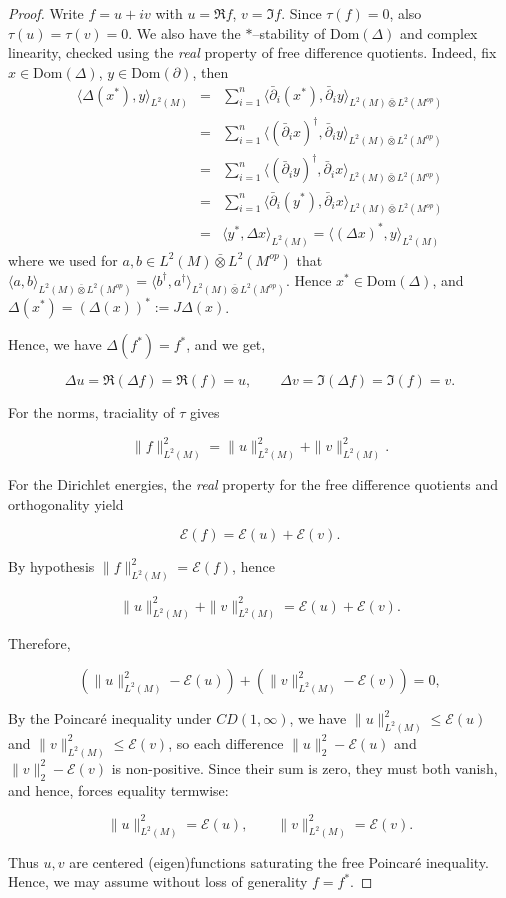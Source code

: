 \documentclass[10pt,a4paper]{amsart}
\newcommand{\Dom}{\mathrm{Dom}}
\begin{document}
\begin{proof}
Write $f=u+iv$ with $u=\Re f$, $v=\Im f$. Since $\tau(f)=0$, also $\tau(u)=\tau(v)=0$.  
We also have the $\ast$–stability of $\Dom(\Delta)$ and complex linearity, checked using the \emph{real} property of free difference quotients. Indeed, fix $x\in \Dom(\Delta)$, $y\in \Dom( \partial)$, then
\begin{eqnarray}
    \langle \Delta (x^*),y\rangle_{L^2(M)}&=&\sum_{i=1}^n \langle \bar \partial_i (x^*),\bar\partial_i y\rangle_{L^2(M)\bar\otimes L^2(M^{op})}\nonumber\\
    &=&\sum_{i=1}^n \langle (\bar \partial_i x)^{\dagger},\bar\partial_i y\rangle_{L^2(M)\bar\otimes L^2(M^{op})}\nonumber\\
    &=& \sum_{i=1}^n \langle (\bar \partial_i y)^{\dagger},\bar\partial_i x\rangle_{L^2(M)\bar\otimes L^2(M^{op})}\nonumber\\
    &=& \sum_{i=1}^n \langle \bar \partial_i (y^*),\bar\partial_i x\rangle_{L^2(M)\bar\otimes L^2(M^{op})}\nonumber\\
    &=& \langle y^*,\Delta x\rangle_{L^2(M)}=\langle (\Delta x)^*,y\rangle_{L^2(M)}
\end{eqnarray}
where we used for $a,b\in L^2(M)\bar\otimes L^2(M^{op})$ that $\langle a,b\rangle_{L^2(M)\bar\otimes L^2(M^{op})}=\langle b^{\dagger},a^{\dagger}\rangle_{L^2(M)\bar\otimes L^2(M^{op})}$. Hence $x^*\in \Dom(\Delta)$, and $\Delta(x^*)=(\Delta(x))^*:=J\Delta(x)$.
\bigbreak

Hence, we have $\Delta(f^*)=f^*$, and we get,

\[
\Delta u=\Re(\Delta f)=\Re(f)=u,\qquad
\Delta v=\Im(\Delta f)=\Im(f)=v.
\]


For the norms, traciality of $\tau$ gives


\[
\|f\|_{L^2(M)}^2=\|u\|_{L^2(M)}^2+\|v\|_{L^2(M)}^2.
\]


For the Dirichlet energies, the \emph{real} property for the free difference quotients and orthogonality yield


\[
\mathcal{E}(f)=\mathcal{E}(u)+\mathcal{E}(v).
\]


By hypothesis $\|f\|^2_{L^2(M)}=\mathcal{E}(f)$, hence


\[
\|u\|^2_{L^2(M)}+\|v\|^2_{L^2(M)}=\mathcal{E}(u)+\mathcal{E}(v).
\]


Therefore,


\[
(\|u\|^2_{L^2(M)}-\mathcal{E}(u))+(\|v\|^2_{L^2(M)}-\mathcal{E}(v))=0,
\]


By the Poincaré inequality under $CD(1,\infty)$, we have
$\|u\|_{L^2(M)}^2\le \mathcal{E}(u)$ and $\|v\|_{L^2(M)}^2\le \mathcal{E}(v)$, so each
difference $\|u\|_2^2-\mathcal{E}(u)$ and $\|v\|_2^2-\mathcal{E}(v)$ is
non-positive. Since their sum is zero, they must both vanish, and hence, forces equality termwise:


\[
\|u\|^2_{L^2(M)}=\mathcal{E}(u),\qquad \|v\|^2_{L^2(M)}=\mathcal{E}(v).
\]

\bigbreak
Thus $u,v$ are centered (eigen)functions saturating the free Poincaré inequality. Hence, we may assume without loss of generality $f=f^\ast$.
\end{proof}
\end{document}
